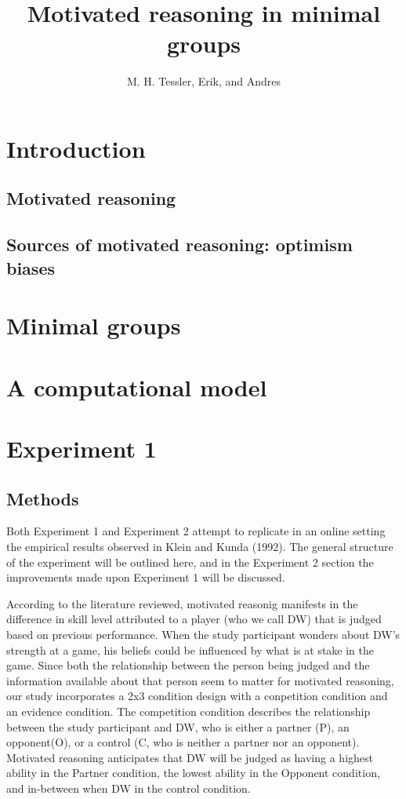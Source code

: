 \documentclass{article} \usepackage{apacite} \usepackage{graphicx} \usepackage{listings}
\begin{document}
 \title{Motivated reasoning in minimal groups}
\author{M. H. Tessler, Erik, and Andres} \renewcommand{\today}{Psych 241\\June 8,
2014} \maketitle

\section{Introduction}

\subsection{Motivated reasoning}

\subsection{Sources of motivated reasoning: optimism biases}

\section{Minimal groups}

\section{A computational model}

\section{Experiment 1}

\subsection{Methods}

Both Experiment 1 and Experiment 2 attempt to replicate in an online setting the empirical results observed in Klein and Kunda (1992). The general structure of the experiment will be outlined here, and in the Experiment 2 section the improvements made upon Experiment 1 will be discussed.

According to the literature reviewed, motivated reasonig manifests in the difference in skill level attributed to a player (who we call DW) that is judged based on previous performance. When the study participant wonders about DW's strength at a game, his beliefs could be influenced by what is at stake in the game. Since both the relationship between the person being judged and the information available about that person seem to matter for motivated reasoning, our study incorporates a 2x3 condition design with a conpetition condition and an evidence condition. The competition condition describes the relationship between the study participant and DW, who is either a partner (P), an opponent(O), or a control (C, who is neither a partner nor an opponent). Motivated reasoning anticipates that DW will be judged as having a highest ability in the Partner condition, the lowest ability in the Opponent condition, and in-between when DW in the control condition. 
\end{document}
